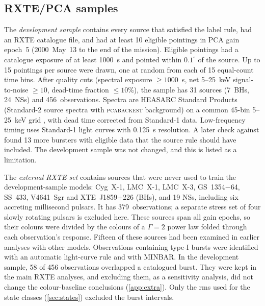 \documentclass[11pt,a4paper]{article}
\begin{document}
\subsection{RXTE/PCA samples}\label{sec:rxte}
The \emph{development sample} contains every source that satisfied the label rule, had an RXTE catalogue file, and had at
least 10 eligible pointings in PCA gain epoch~5 (2000~May~13 to the end of the mission). Eligible pointings had a
catalogue exposure of at least 1000~s and pointed within $0.1^\circ$ of the source. Up to 15 pointings per source were
drawn, one at random from each of 15 equal-count time bins. After quality cuts (spectral exposure $\geq1000$~s, net
5--25~keV signal-to-noise $\geq10$, dead-time fraction $\leq10$\%), the sample has 31 sources (7~BHs, 24~NSs) and
456~observations. Spectra are HEASARC Standard Products (Standard-2 source spectra with \textsc{pcabackest} background) on
a common 45-bin 5--25~keV grid \citep{Jahoda2006}, with dead time corrected from Standard-1 data. Low-frequency
timing uses Standard-1 light curves with 0.125~s resolution. A later check against \citet{Galloway2008} found 13 more
bursters with eligible data that the source rule should have included. The development sample was not changed, and this
is listed as a limitation.

The \emph{external RXTE set} contains sources that were never used to train the development-sample models: Cyg~X-1,
LMC~X-1, LMC~X-3, GS~1354$-$64, SS~433, V4641~Sgr and XTE~J1859$+$226 (BHs), and 19 NSs, including six accreting
millisecond pulsars. It has 379~observations; a separate stress set of four slowly rotating pulsars is excluded here.
These sources span all gain epochs, so their colours were divided by the colours of a $\Gamma=2$ power law folded
through each observation's response. Fifteen of these sources had been examined in earlier analyses with other models.
Observations containing type-I bursts were identified with an automatic light-curve rule and with MINBAR. In the
development sample, 58 of 456 observations overlapped a catalogued burst. They were kept in the main RXTE analyses, and
excluding them, as a sensitivity analysis, did not change the colour-baseline conclusions (\cref{app:extra}). Only the
rms used for the state classes (\cref{sec:states}) excluded the burst intervals.
\end{document}
